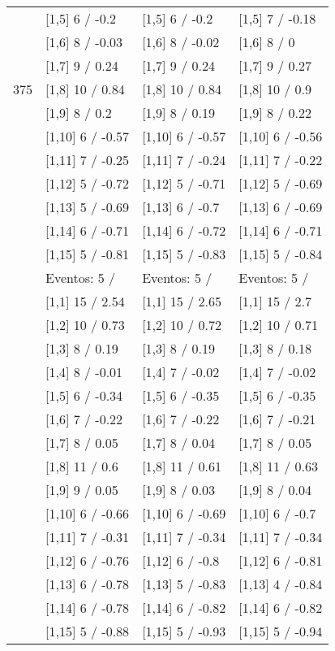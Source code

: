 \begin{table}
\begin{tabular}[t]{llll}
 & {}[1,5] 6  / -0.2 & {}[1,5] 6  / -0.2 & {}[1,5] 7  / -0.18\\
 & {}[1,6] 8  / -0.03 & {}[1,6] 8  / -0.02 & {}[1,6] 8  / 0\\
 & {}[1,7] 9  / 0.24 & {}[1,7] 9  / 0.24 & {}[1,7] 9  / 0.27\\
375 & {}[1,8] 10  / 0.84 & {}[1,8] 10  / 0.84 & {}[1,8] 10  / 0.9\\
\addlinespace
 & {}[1,9] 8  / 0.2 & {}[1,9] 8  / 0.19 & {}[1,9] 8  / 0.22\\
 & {}[1,10] 6  / -0.57 & {}[1,10] 6  / -0.57 & {}[1,10] 6  / -0.56\\
 & {}[1,11] 7  / -0.25 & {}[1,11] 7  / -0.24 & {}[1,11] 7  / -0.22\\
 & {}[1,12] 5  / -0.72 & {}[1,12] 5  / -0.71 & {}[1,12] 5  / -0.69\\
 & {}[1,13] 5  / -0.69 & {}[1,13] 6  / -0.7 & {}[1,13] 6  / -0.69\\
\addlinespace
 & {}[1,14] 6  / -0.71 & {}[1,14] 6  / -0.72 & {}[1,14] 6  / -0.71\\
 & {}[1,15] 5  / -0.81 & {}[1,15] 5  / -0.83 & {}[1,15] 5  / -0.84\\
 & Eventos:  5 / & Eventos:  5 / & Eventos:  5 /\\
 & {}[1,1] 15  / 2.54 & {}[1,1] 15  / 2.65 & {}[1,1] 15  / 2.7\\
 & {}[1,2] 10  / 0.73 & {}[1,2] 10  / 0.72 & {}[1,2] 10  / 0.71\\
\addlinespace
 & {}[1,3] 8  / 0.19 & {}[1,3] 8  / 0.19 & {}[1,3] 8  / 0.18\\
 & {}[1,4] 8  / -0.01 & {}[1,4] 7  / -0.02 & {}[1,4] 7  / -0.02\\
 & {}[1,5] 6  / -0.34 & {}[1,5] 6  / -0.35 & {}[1,5] 6  / -0.35\\
 & {}[1,6] 7  / -0.22 & {}[1,6] 7  / -0.22 & {}[1,6] 7  / -0.21\\
 & {}[1,7] 8  / 0.05 & {}[1,7] 8  / 0.04 & {}[1,7] 8  / 0.05\\
\addlinespace
500 & {}[1,8] 11  / 0.6 & {}[1,8] 11  / 0.61 & {}[1,8] 11  / 0.63\\
 & {}[1,9] 9  / 0.05 & {}[1,9] 8  / 0.03 & {}[1,9] 8  / 0.04\\
 & {}[1,10] 6  / -0.66 & {}[1,10] 6  / -0.69 & {}[1,10] 6  / -0.7\\
 & {}[1,11] 7  / -0.31 & {}[1,11] 7  / -0.34 & {}[1,11] 7  / -0.34\\
 & {}[1,12] 6  / -0.76 & {}[1,12] 6  / -0.8 & {}[1,12] 6  / -0.81\\
\addlinespace
 & {}[1,13] 6  / -0.78 & {}[1,13] 5  / -0.83 & {}[1,13] 4  / -0.84\\
 & {}[1,14] 6  / -0.78 & {}[1,14] 6  / -0.82 & {}[1,14] 6  / -0.82\\
 & {}[1,15] 5  / -0.88 & {}[1,15] 5  / -0.93 & {}[1,15] 5  / -0.94\\
\bottomrule
\end{tabular}
\end{table}
